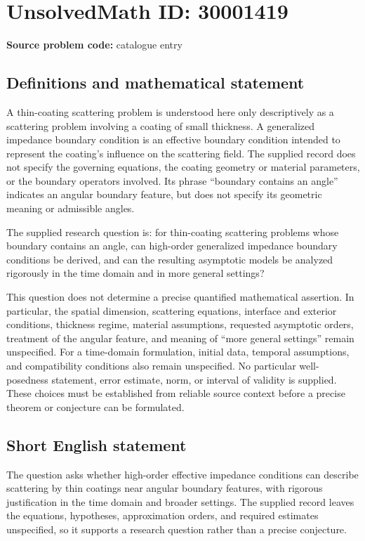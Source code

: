 \documentclass[11pt]{article}
\begin{document}
\section*{UnsolvedMath ID: 30001419}
\textbf{Source problem code:} catalogue entry
\subsection{Definitions and mathematical statement}
A thin-coating scattering problem is understood here only descriptively as a scattering problem involving a coating of small thickness. A generalized impedance boundary condition is an effective boundary condition intended to represent the coating's influence on the scattering field. The supplied record does not specify the governing equations, the coating geometry or material parameters, or the boundary operators involved. Its phrase ``boundary contains an angle'' indicates an angular boundary feature, but does not specify its geometric meaning or admissible angles.

The supplied research question is: for thin-coating scattering problems whose boundary contains an angle, can high-order generalized impedance boundary conditions be derived, and can the resulting asymptotic models be analyzed rigorously in the time domain and in more general settings?

This question does not determine a precise quantified mathematical assertion. In particular, the spatial dimension, scattering equations, interface and exterior conditions, thickness regime, material assumptions, requested asymptotic orders, treatment of the angular feature, and meaning of ``more general settings'' remain unspecified. For a time-domain formulation, initial data, temporal assumptions, and compatibility conditions also remain unspecified. No particular well-posedness statement, error estimate, norm, or interval of validity is supplied. These choices must be established from reliable source context before a precise theorem or conjecture can be formulated.
\subsection{Short English statement}
The question asks whether high-order effective impedance conditions can describe scattering by thin coatings near angular boundary features, with rigorous justification in the time domain and broader settings. The supplied record leaves the equations, hypotheses, approximation orders, and required estimates unspecified, so it supports a research question rather than a precise conjecture.
\end{document}
